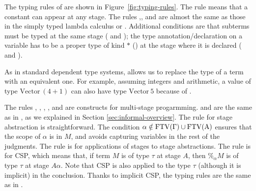 The typing rules of \LMD are shown in Figure~\ref{fig:typing-rules}.
The rule \TConst{} means that a constant can appear at any stage.
The rules \TVar,\TAbs, and \TApp{} are almost the same as those in the simply typed
lambda calculus or \LLF.  Additional conditions are that subterms must be
typed at the same stage (\TAbs{} and \TApp); the type
annotation/declaration on a variable has to be a proper type of kind
$*$ (\TAbs) at the stage where it is declared (\TVar{} and \TAbs).



As in standard dependent type systems, \TConv{} allows us to replace the type
of a term with an equivalent one. For example, assuming integers and
arithmetic, a value of type $\textrm{Vector}\ (4+1)$ can also have type
$\textrm{Vector}\ 5$ because of \TConv{}.

The rules \TTB, \TTBL, \TGen, \TIns, and \TCsp{} are constructs for
multi-stage progarmming. \TTB{} and \TTBL{} are the same as in \LTP, as we
explained in Section \ref{sec:informal-overview}. The rule \TGen{} for stage
abstraction is straightforward. The condition
$\alpha\notin\rm{FTV}(\Gamma)\cup\rm{FTV}(A)$ ensures that the scope of $\alpha$
is in $M$, and avoids capturing variables in the rest of the judgments. The
rule \TIns{} is for applications of stages to stage abstractions. The rule
\TCsp{} is for CSP, which means that, if term $M$ is of type $\tau$ at stage
$A$, then $\%_\alpha M$ is of type $\tau$ at stage $A\alpha$. Note that CSP
is also applied to the type \(\tau\) (although it is implicit) in the
conclusion. Thanks to implicit CSP, the typing rules are the same as in \LTP.


